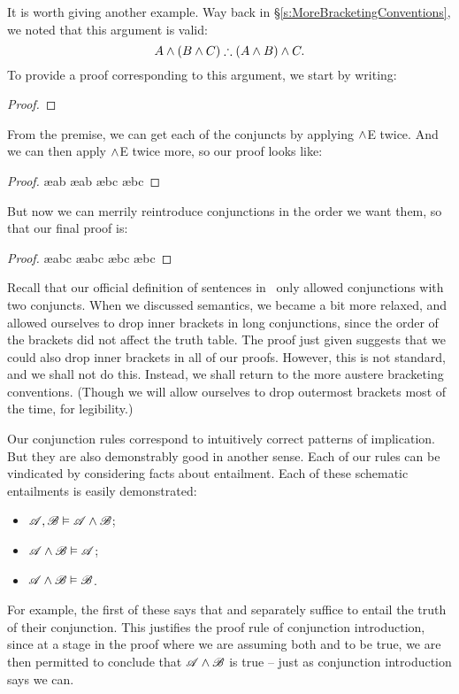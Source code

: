 It is worth giving another example. Way back in §\ref{s:MoreBracketingConventions}, we noted that this argument is valid:
	$$A \wedge (B \wedge C) \mathrel{\therefore} (A \wedge B) \wedge C.$$
To provide a proof corresponding to this argument, we start by writing:
\begin{proof}
\end{proof}
From the premise, we can get each of the conjuncts by applying $\wedge$E twice. And we can then apply $\wedge$E twice more, so our proof looks like:
\begin{proof}
	 \ae{ab}
	 \ae{ab}
	 \ae{bc}
	 \ae{bc}
\end{proof}
But now we can merrily reintroduce conjunctions in the order we want them, so that our final proof is:
\begin{proof}
	 \ae{abc}
	 \ae{abc}
	 \ae{bc}
	 \ae{bc}
\end{proof}
Recall that our official definition of sentences in \TFL\ only allowed conjunctions with two conjuncts. When we discussed semantics, we became a bit more relaxed, and allowed ourselves to drop inner brackets in long conjunctions, since the order of the brackets did not affect the truth table. The proof just given suggests that we could also drop inner brackets in all of our proofs. However, this is not standard, and we shall not do this. Instead, we shall return to the more austere bracketing conventions. (Though we will allow ourselves to drop outermost brackets most of the time, for legibility.)

Our conjunction rules correspond to intuitively correct patterns of implication. But they are also demonstrably good in another sense. Each of our rules can be vindicated by considering facts about entailment. Each of these schematic entailments is easily demonstrated: \begin{itemize}
	\item $\mathscr{A}, \mathscr{B} \vDash \mathscr{A} \wedge \mathscr{B}$;
	\item 	$\mathscr{A} \wedge \mathscr{B} \vDash \mathscr{A}$;
	\item $\mathscr{A} \wedge \mathscr{B} \vDash \mathscr{B}$.
\end{itemize} For example, the first of these says that  and  separately suffice to entail the truth of their conjunction. This justifies the proof rule of conjunction introduction, since at a stage in the proof where we are assuming both  and  to be true, we are then permitted to conclude that $\mathscr{A}\wedge\mathscr{B}$ is true – just as conjunction introduction says we can.

